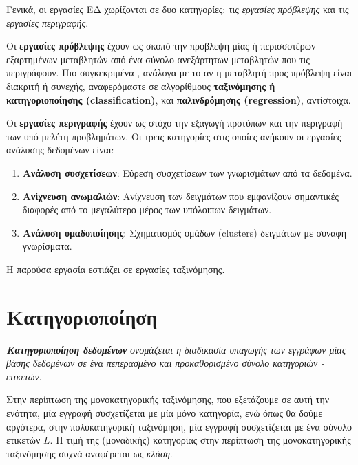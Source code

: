 Γενικά, οι εργασίες ΕΔ χωρίζονται σε δυο κατηγορίες: τις \emph{εργασίες πρόβλεψης} και τις \emph{εργασίες περιγραφής}. 

Οι \textbf{εργασίες πρόβλεψης} έχουν ως σκοπό την πρόβλεψη μίας ή περισσοτέρων εξαρτημένων μεταβλητών από ένα σύνολο ανεξάρτητων μεταβλητών που τις περιγράφουν. Πιο συγκεκριμένα \cite{tan}, ανάλογα με το αν η μεταβλητή προς πρόβλεψη είναι διακριτή ή συνεχής, αναφερόμαστε σε αλγορίθμους \textbf{ταξινόμησης ή κατηγοριοποίησης (classification)}, και \textbf{παλινδρόμησης (regression)}, αντίστοιχα.

Οι \textbf{εργασίες περιγραφής} έχουν ως στόχο την εξαγωγή προτύπων και την περιγραφή των υπό μελέτη προβλημάτων. Οι τρεις κατηγορίες στις οποίες ανήκουν οι εργασίες ανάλυσης δεδομένων είναι:

\begin{enumerate}
  \item \textbf{Ανάλυση συσχετίσεων}: Εύρεση συσχετίσεων των γνωρισμάτων από τα δεδομένα.
  \item \textbf{Ανίχνευση ανωμαλιών}: Ανίχνευση των δειγμάτων που εμφανίζουν σημαντικές διαφορές από το μεγαλύτερο μέρος των υπόλοιπων δειγμάτων.
  \item \textbf{Ανάλυση ομαδοποίησης}: Σχηματισμός ομάδων (clusters) δειγμάτων με συναφή γνωρίσματα.

\end{enumerate}
 
Η παρούσα εργασία εστιάζει σε εργασίες ταξινόμησης. 

\section{Κατηγοριοποίηση}

\emph{\textbf{Κατηγοριοποίηση δεδομένων} ονομάζεται η διαδικασία υπαγωγής των εγγράφων μίας βάσης δεδομένων σε ένα πεπερασμένο και προκαθορισμένο σύνολο κατηγοριών - ετικετών}.

Στην περίπτωση της μονοκατηγορικής ταξινόμησης, που εξετάζουμε σε αυτή την ενότητα, μία εγγραφή συσχετίζεται με μία μόνο κατηγορία, ενώ όπως θα δούμε αργότερα, στην πολυκατηγορική ταξινόμηση, μία εγγραφή συσχετίζεται με ένα σύνολο ετικετών $L$. Η τιμή της (μοναδικής) κατηγορίας στην περίπτωση της μονοκατηγορικής ταξινόμησης συχνά αναφέρεται ως \emph{κλάση}.


